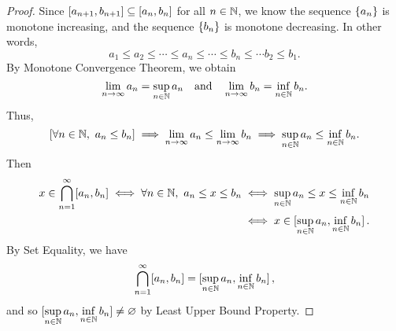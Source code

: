 \documentclass[11pt,openany]{article}
\begin{document}
\begin{proof}
	Since $\intcc{a_{n+1},b_{n+1}}\subseteq\intcc{a_n,b_n}$ for all $n\in\mathbb{N}$, we know  the sequence $\set{a_n}$ is monotone increasing, and the sequence $\set{b_n}$ is monotone decreasing. In other words, \[
	a_1\leq a_2\leq\cdots\leq a_n\leq \cdots\leq b_n\leq\cdots b_2\leq b_1.
	\] By Monotone Convergence Theorem, we obtain \[
	\lim\limits_{n\to\infty}a_n=\sup_{n\in\mathbb{N}} a_n\quad\text{and}\quad\lim\limits_{n\to\infty}b_n=\inf\limits_{n\in\mathbb{N}}b_n.
	\] 
	Thus, \[
	[\forall n\in\mathbb{N},\ a_n\leq b_n]\implies \lim\limits_{n\to\infty}a_n\leq\lim\limits_{n\to\infty}b_n\\
	\implies\sup\limits_{n\in\mathbb{N}} a_n\leq\inf\limits_{n\in\mathbb{N}} b_n.
	\]
Then \begin{align*}
x\in\bigcap_{n=1}^\infty[a_n,b_n]\iff \forall n\in\N,\ a_n\leq x\leq b_n
&\iff \sup\limits_{n\in\N} a_n\leq x\leq \inf\limits_{n\in\N} b_n\\
&\iff x\in\intcc[0]{\sup\limits_{n\in\N} a_n, \inf\limits_{n\in\N} b_n}.
\end{align*} By Set Equality, we have \[
\bigcap_{n=1}^\infty[a_n,b_n]=\intcc[0]{\sup\limits_{n\in\N} a_n, \inf\limits_{n\in\N} b_n},
\] and so $\intcc[0]{\sup\limits_{n\in\N} a_n, \inf\limits_{n\in\N} b_n}\neq\varnothing$ by Least Upper Bound Property.
\end{proof}
\end{document}
